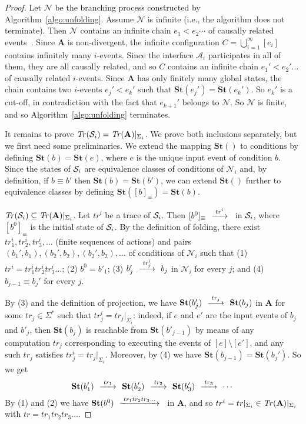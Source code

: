 \documentclass{llncs}
\def\A{\mathcal{A}}
\def\prod{\mathbf{A}}
\def\N{\mathcal{N}}
\def\S{\mathcal{S}}
\newcommand{\st}[1]{\mathbf{St}(#1)}
\newcommand{\Tr}[1]{{\it Tr}(#1)}
\renewcommand{\S}{{\cal S}}
\def\trace{tr}
\def\by#1{\mathop{{\hbox{\setbox0=\hbox{$\scriptstyle{#1\quad}$}{$\buildrel{\quad\scriptstyle{#1}\quad}\over{\hbox to \wd0{\rightarrowfill}}$}}}}}
\begin{document}
\begin{proof}
Let $\N$ be the branching process constructed by Algorithm~\ref{algo:unfolding}.
Assume $\N$ is infinite (i.e., the algorithm does not terminate). 
Then $\N$ contains an infinite chain $e_1 < e_2 \cdots$ of causally related events~\cite{Khomenko03}. 
Since $\prod$ is non-divergent, the infinite configuration $C=\bigcup_{i=1}^\infty [e_i]$ contains infinitely
many $i$-events. Since the interface $\A_i$ participates in all of them, they are all causally related, 
and so $C$ contains an infinite chain $e_1' < e_2' \ldots$ of causally related $i$-events. Since
$\prod$ has only finitely many global states, the chain contains two $i$-events $e_j'<e_k'$ such that
$\st{e_j'}=\st{e_k'}$. So $e_k'$ is a cut-off, in contradiction with the fact that $e_{k+1}'$ belongs to $\N$. 
So $\N$ is finite, and so Algorithm~\ref{algo:unfolding} terminates.

\vspace{0.2cm}
It remains to prove $\Tr{\S_i}=\Tr{\prod}|_{\Sigma_i}$. We prove both inclusions separately,
but we first need some preliminaries. We extend the mapping $\st{}$ to conditions
by defining $\st{b}=\st{e}$, where $e$ is the unique input event of condition $b$. Since the states of $\S_i$ 
are equivalence classes of conditions of $\N_i$ and, by definition, if $b \equiv b'$ 
then $\st{b} = \st{b'}$, we can extend $\st{}$ further to equivalence classes by defining
$\st{[b]_\equiv} = \st{b}$. 

$\Tr{\S_i} \subseteq \Tr{\prod}|_{\Sigma_i}$. Let $\trace^i$ be a trace of $\S_i$. Then $[b^0]_\equiv \by{\trace^i}$ in $\S_i$,
where $[b^0]_\equiv$ is the initial state of $\S_i$.
By the definition of folding, there exist $\trace^i_{1},\trace^i_{2},\trace^i_{3}, \ldots$ (finite sequences of actions) and pairs $(b_1',b_1),(b_2',b_2),(b_2',b_2), \ldots$ of conditions of $\N_i$ such that
(1) $\trace^i = \trace^i_{1} \trace^i_{2} \trace^i_{3}\ldots $; (2) $b^0=b'_1$; (3) $b_{j}' \by{\trace_{j}^i} b_j$ in $\N_i$ for every $j$; 
and (4) $b_{j-1} \equiv  b_j'$ for every $j$. 

By (3) and the definition of projection, we have
$\st{b_{j}'} \by{\trace_{j}} \st{b_j}$ in $\prod$ for some $\trace_j \in \Sigma^*$ such that $\trace^i_{j}=\trace_j|_{\Sigma_i}$: indeed, if $e$ and $e'$ are the input events of $b_j$ and $b'_{j}$, then $\st{b_j}$ is reachable from $\st{b'_{j-1}}$ by means of any computation $\trace_j$ corresponding to executing the events of $[e] \setminus [e']$, and any
such $\trace_j$ satisfies $\trace^i_{j}=\trace_j|_{\Sigma_i}$. Moreover, by (4) we have $\st{b_{j-1}}=\st{b_j'}$. So we get 
$$\st{b_1'} \by{\trace_{1}} \st{b_2'} \by{\trace_{2}} \st{b_3'} \by{\trace_{3}} \cdots$$
\noindent By (1) and (2) we have $\st{b^0}\by{\trace_1\trace_2\trace_3\dots}$ in $\prod$, and so
$\trace^i=\trace|_{\Sigma_i}\in\Tr{\prod}|_{\Sigma_i}$ with $\trace=\trace_1\trace_2\trace_3\dots$.


\end{proof}
\end{document}
